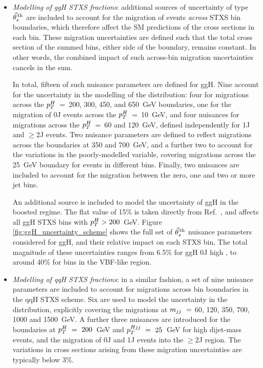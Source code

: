 \begin{itemize}
    \item \textit{Modelling of ggH STXS fractions}: additional sources of uncertainty of type $\vec{\theta}^{\,\rm{th}}_{s}$ are included to account for the migration of events \textit{across} STXS bin boundaries, which therefore affect the SM predictions of the cross sections in each bin. These migration uncertainties are defined such that the total cross section of the summed bins, either side of the boundary, remains constant. In other words, the combined impact of such across-bin migration uncertainties cancels in the sum.
    
    \noindent
    In total, fifteen of such nuisance parameters are defined for ggH. Nine account for the uncertainty in the modelling of the \ptH distribution: four for migrations across the $p_T^H$~=~200, 300, 450, and 650~GeV boundaries, one for the migration of 0J events across the $p_T^H$~=~10~GeV, and four nuisances for migrations across the $p_T^H$~=~60 and 120~GeV, defined independently for 1J and $\geq$2J events. Two nuisance parameters are defined to reflect migrations across the \mjj boundaries at 350 and 700~GeV, and a further two to account for the variations in the poorly-modelled \ptHjj variable, covering migrations across the 25~GeV boundary for events in different \mjj bins. Finally, two nuisances are included to account for the migration between the zero, one and two or more jet bins. 
    
    \noindent
    An additional source is included to model the uncertainty of ggH in the boosted regime. The flat value of 15\% is taken directly from Ref.~\cite{Becker:2020rjp}, and affects all ggH STXS bins with $p_T^H>200$~GeV. Figure \ref{fig:ggH_uncertainty_scheme} shows the full set of $\vec{\theta}^{\,\rm{th}}_{s}$ nuisance parameters considered for ggH, and their relative impact on each STXS bin. The total magnitude of these uncertainties ranges from 6.5\% for ggH 0J high \ptH, to around 40\% for bins in the VBF-like region.
    
    \item \textit{Modelling of qqH STXS fractions}: in a similar fashion, a set of nine nuisance parameters are included to account for migrations across bin boundaries in the qqH STXS scheme. Six are used to model the uncertainty in the \mjj distribution, explicitly covering the migrations at $m_{jj}~=~$60, 120, 350, 700, 1000 and 1500~GeV. A further three nuisances are introduced for the boundaries at $p_T^H~=~200$~GeV and $p_T^{Hjj}~=~25$~GeV for high dijet-mass events, and the migration of 0J and 1J events into the $\geq$2J region. The variations in cross sections arising from these migration uncertainties are typically below 3\%.
    

\end{itemize}
